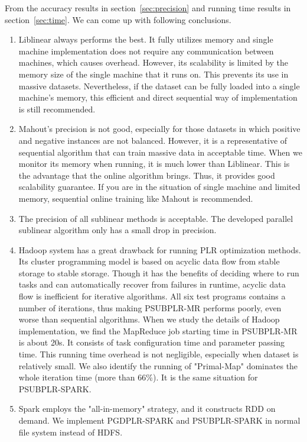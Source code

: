 \documentclass{llncs}
\begin{document}
From the accuracy results in section~\ref{sec:precision} and running time results in section~\ref{sec:time}.
We can come up with following conclusions.
\begin{enumerate}
    \item Liblinear always performs the best. It fully utilizes memory and single machine implementation does not require any communication between machines, which causes overhead.
          However, its scalability is limited by the memory size of the single machine that it runs on. This prevents its use in massive datasets.
          Nevertheless, if the dataset can be fully loaded into a single machine's memory, this efficient and direct sequential way of implementation is still recommended.
    \item Mahout's precision is not good, especially for those datasets in which positive and negative instances are not balanced.
          However, it is a representative of sequential algorithm that can train massive data in acceptable time.
          When we monitor its memory when running, it is much lower than Liblinear. This is the advantage that the online algorithm brings.
          Thus, it provides good scalability guarantee. If you are in the situation of single machine and limited memory, sequential online training like Mahout is recommended.
    \item The precision of all sublinear methods is acceptable. The developed parallel sublinear algorithm only has a small drop in precision.
    \item Hadoop system has a great drawback for running PLR optimization methods. Its cluster programming model is based on acyclic data flow from stable storage to stable storage.
          Though it has the benefits of deciding where to run tasks and can automatically recover from failures in runtime, acyclic data flow is inefficient for iterative algorithms.
          All six test programs contains a number of iterations, thus making PSUBPLR-MR performs poorly, even worse than sequential algorithms.
          When we study the details of Hadoop implementation, we find the MapReduce job starting time in PSUBPLR-MR is about 20s. It consists of task configuration time and parameter passing time.
          This running time overhead is not negligible, especially when dataset is relatively small.
          We also identify the running of "Primal-Map" dominates the whole iteration time (more than 66\%). It is the same situation for PSUBPLR-SPARK.
    \item Spark employs the "all-in-memory" strategy, and it constructs RDD on demand. We implement PGDPLR-SPARK and PSUBPLR-SPARK in normal file system instead of HDFS.

\end{enumerate}
\end{document}
